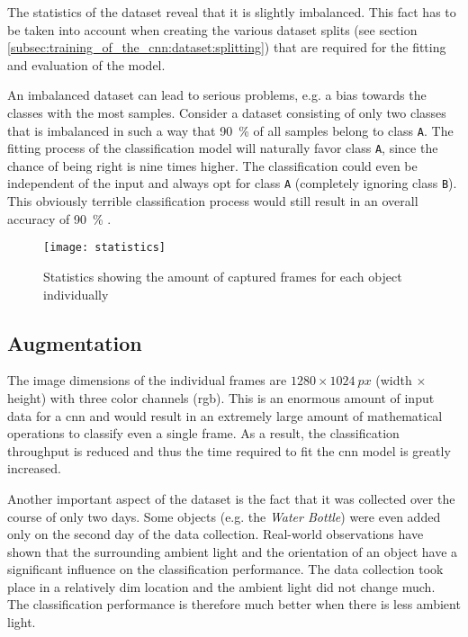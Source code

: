 The statistics of the dataset reveal that it is slightly imbalanced.
This fact has to be taken into account when creating the various dataset splits (see section \ref{subsec:training_of_the_cnn:dataset:splitting}) that are required for the fitting and evaluation of the model.

An imbalanced dataset can lead to serious problems, e.g. a bias towards the classes with the most samples.
Consider a dataset consisting of only two classes that is imbalanced in such a way that \SI{90}{\percent} of all samples belong to class \texttt{A}.
The fitting process of the classification model will naturally favor class \texttt{A}, since the chance of being right is nine times higher.
The classification could even be independent of the input and always opt for class \texttt{A} (completely ignoring class \texttt{B}).
This obviously terrible classification process would still result in an overall accuracy of \SI{90}{\percent} \cite{training_imbalanced}.

\begin{figure}
  \centering
  \texttt{[image: statistics]}
  \caption{Statistics showing the amount of captured frames for each object individually}
  \label{fig:statistics}
\end{figure}

\subsection{Augmentation}
\label{subsec:training_of_the_cnn:dataset:augmentation}

The image dimensions of the individual frames are $1280\times\SI{1024}{px}$ (width $\times$ height) with three color channels (\acrshort{rgb}).
This is an enormous amount of input data for a \acrlong{cnn} and would result in an extremely large amount of mathematical operations to classify even a single frame.
As a result, the classification throughput is reduced and thus the time required to fit the \acrshort{cnn} model is greatly increased.

Another important aspect of the dataset is the fact that it was collected over the course of only two days.
Some objects (e.g. the \textit{Water Bottle}) were even added only on the second day of the data collection.
Real-world observations have shown that the surrounding ambient light and the orientation of an object have a significant influence on the classification performance.
The data collection took place in a relatively dim location and the ambient light did not change much.
The classification performance is therefore much better when there is less ambient light.


